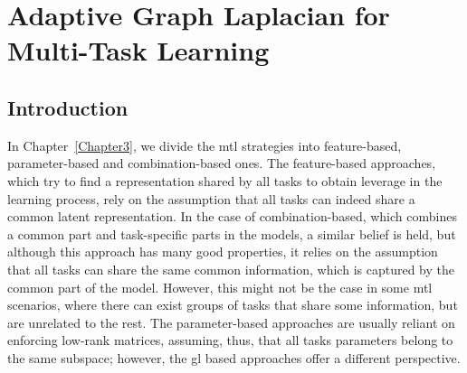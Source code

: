
\chapter{Adaptive Graph Laplacian for Multi-Task Learning} %
\label{Chapter5}

{\bf \small{

}}

\section{Introduction}
In Chapter~\ref{Chapter3}, we divide the \acrfull{mtl} strategies into feature-based, parameter-based and combination-based ones.
The feature-based approaches, which try to find a representation shared by all tasks to obtain leverage in the learning process, rely on the assumption that all tasks can indeed share a common latent representation.
In the case of combination-based, which combines a common part and task-specific parts in the models, a similar belief is held, but although this approach has many good properties, it relies on the assumption that all tasks can share the same common information, which is captured by the common part of the model.
However, this might not be the case in some \acrshort{mtl} scenarios, where there can exist groups of tasks that share some information, but are unrelated to the rest.
The parameter-based approaches are usually reliant on enforcing low-rank matrices, assuming, thus, that all tasks parameters belong to the same subspace; however, the \acrfull{gl} based approaches offer a different perspective.

